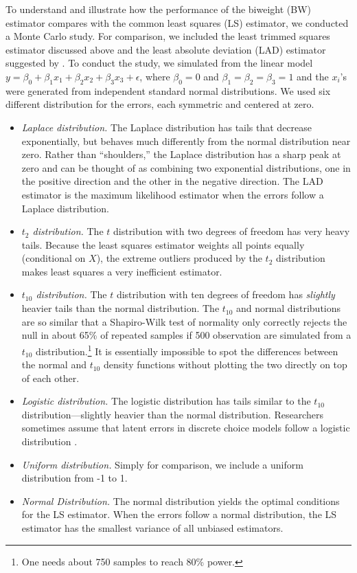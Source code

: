 \documentclass[12pt]{article}
\begin{document}
To understand and illustrate how the performance of the biweight (BW) estimator compares with the common least squares (LS) estimator, we conducted a Monte Carlo study. For comparison, we included the least trimmed squares estimator discussed above and the least absolute deviation (LAD) estimator suggested by \cite{HardenDesmarais2011}. To conduct the study, we simulated from the linear model $y = \beta_0 + \beta_1x_1 + \beta_2 x_2 + \beta_3 x_3 + \epsilon$, where $\beta_0 = 0$ and $\beta_1 = \beta_2 = \beta_3 = 1$ and the $x_i$'s were generated from independent standard normal distributions. 
We used six different distribution for the errors, each symmetric and centered at zero.
\begin{itemize}
\item \textit{Laplace distribution.} 
The Laplace distribution has tails that decrease exponentially, but behaves much differently from the normal distribution near zero. 
Rather than ``shoulders,'' the Laplace distribution has a sharp peak at zero and can be thought of as combining two exponential distributions, one in the positive direction and the other in the negative direction.
The LAD estimator is the maximum likelihood estimator when the errors follow a Laplace distribution.
\item \textit{$t_2$ distribution.} 
The $t$ distribution with two degrees of freedom has very heavy tails. 
Because the least squares estimator weights all points equally (conditional on $X$), the extreme outliers produced by the $t_2$ distribution makes least squares a very inefficient estimator.
\item \textit{$t_{10}$ distribution.} 
The $t$ distribution with ten degrees of freedom has \textit{slightly} heavier tails than the normal distribution. 
The $t_{10}$ and normal distributions are so similar that a Shapiro-Wilk test of normality only correctly rejects the null in about 65\% of repeated samples if 500 observation are simulated from a $t_{10}$ distribution.\footnote{One needs about 750 samples to reach 80\% power.} 
It is essentially impossible to spot the differences between the normal and $t_{10}$ density functions without plotting the two directly on top of each other.
\item \textit{Logistic distribution.} The logistic distribution has tails similar to the $t_{10}$ distribution---slightly heavier than the normal distribution. Researchers sometimes assume that latent errors in discrete choice models follow a logistic distribution \citep{Train2009}.
\item \textit{Uniform distribution.} Simply for comparison, we include a uniform distribution from -1 to 1.
\item \textit{Normal Distribution.} The normal distribution yields the optimal conditions for the LS estimator. 
When the errors follow a normal distribution, the LS estimator has the smallest variance of all unbiased estimators. 
\end{itemize}
\end{document}
